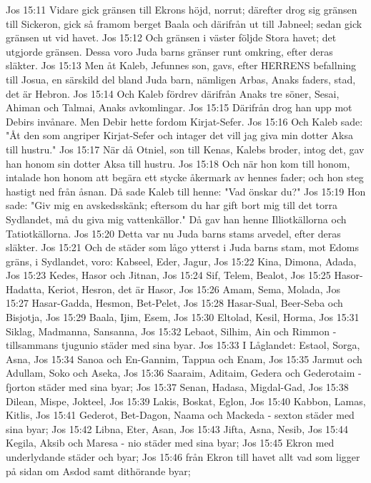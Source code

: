 Jos 15:11  Vidare gick gränsen till Ekrons höjd, norrut; därefter drog sig gränsen till Sickeron, gick så framom berget Baala och därifrån ut till Jabneel; sedan gick gränsen ut vid havet.
Jos 15:12  Och gränsen i väster följde Stora havet; det utgjorde gränsen. Dessa voro Juda barns gränser runt omkring, efter deras släkter.
Jos 15:13  Men åt Kaleb, Jefunnes son, gavs, efter HERRENS befallning till Josua, en särskild del bland Juda barn, nämligen Arbas, Anaks faders, stad, det är Hebron.
Jos 15:14  Och Kaleb fördrev därifrån Anaks tre söner, Sesai, Ahiman och Talmai, Anaks avkomlingar.
Jos 15:15  Därifrån drog han upp mot Debirs invånare. Men Debir hette fordom Kirjat-Sefer.
Jos 15:16  Och Kaleb sade: "Åt den som angriper Kirjat-Sefer och intager det vill jag giva min dotter Aksa till hustru."
Jos 15:17  När då Otniel, son till Kenas, Kalebs broder, intog det, gav han honom sin dotter Aksa till hustru.
Jos 15:18  Och när hon kom till honom, intalade hon honom att begära ett stycke åkermark av hennes fader; och hon steg hastigt ned från åsnan. Då sade Kaleb till henne: "Vad önskar du?"
Jos 15:19  Hon sade: "Giv mig en avskedsskänk; eftersom du har gift bort mig till det torra Sydlandet, må du giva mig vattenkällor." Då gav han henne Illiotkällorna och Tatiotkällorna.
Jos 15:20  Detta var nu Juda barns stams arvedel, efter deras släkter.
Jos 15:21  Och de städer som lågo ytterst i Juda barns stam, mot Edoms gräns, i Sydlandet, voro: Kabseel, Eder, Jagur,
Jos 15:22  Kina, Dimona, Adada,
Jos 15:23  Kedes, Hasor och Jitnan,
Jos 15:24  Sif, Telem, Bealot,
Jos 15:25  Hasor-Hadatta, Keriot, Hesron, det är Hasor,
Jos 15:26  Amam, Sema, Molada,
Jos 15:27  Hasar-Gadda, Hesmon, Bet-Pelet,
Jos 15:28  Hasar-Sual, Beer-Seba och Bisjotja,
Jos 15:29  Baala, Ijim, Esem,
Jos 15:30  Eltolad, Kesil, Horma,
Jos 15:31  Siklag, Madmanna, Sansanna,
Jos 15:32  Lebaot, Silhim, Ain och Rimmon - tillsammans tjugunio städer med sina byar.
Jos 15:33  I Låglandet: Estaol, Sorga, Asna,
Jos 15:34  Sanoa och En-Gannim, Tappua och Enam,
Jos 15:35  Jarmut och Adullam, Soko och Aseka,
Jos 15:36  Saaraim, Aditaim, Gedera och Gederotaim - fjorton städer med sina byar;
Jos 15:37  Senan, Hadasa, Migdal-Gad,
Jos 15:38  Dilean, Mispe, Jokteel,
Jos 15:39  Lakis, Boskat, Eglon,
Jos 15:40  Kabbon, Lamas, Kitlis,
Jos 15:41  Gederot, Bet-Dagon, Naama och Mackeda - sexton städer med sina byar;
Jos 15:42  Libna, Eter, Asan,
Jos 15:43  Jifta, Asna, Nesib,
Jos 15:44  Kegila, Aksib och Maresa - nio städer med sina byar;
Jos 15:45  Ekron med underlydande städer och byar;
Jos 15:46  från Ekron till havet allt vad som ligger på sidan om Asdod samt dithörande byar;

